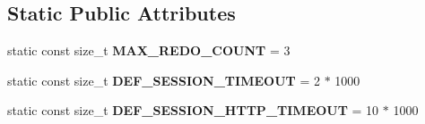 \subsection*{Static Public Attributes}
\begin{DoxyCompactItemize}
\item 
\hypertarget{classBasicHandler_aaa79db27db706d0d3842d34a2ffb5067}{
static const size\_\-t {\bfseries MAX\_\-REDO\_\-COUNT} = 3}
\label{classBasicHandler_aaa79db27db706d0d3842d34a2ffb5067}

\item 
\hypertarget{classBasicHandler_a62c0c5a7a1b7ee7e4e702ea7c462a308}{
static const size\_\-t {\bfseries DEF\_\-SESSION\_\-TIMEOUT} = 2 $\ast$ 1000}
\label{classBasicHandler_a62c0c5a7a1b7ee7e4e702ea7c462a308}

\item 
\hypertarget{classBasicHandler_a369a7e56daab591ef419cb803c0fdcbc}{
static const size\_\-t {\bfseries DEF\_\-SESSION\_\-HTTP\_\-TIMEOUT} = 10 $\ast$ 1000}
\label{classBasicHandler_a369a7e56daab591ef419cb803c0fdcbc}

\end{DoxyCompactItemize}
